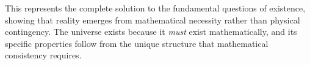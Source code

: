 This represents the complete solution to the fundamental questions of existence, showing that reality emerges from mathematical necessity rather than physical contingency. The universe exists because it \emph{must} exist mathematically, and its specific properties follow from the unique structure that mathematical consistency requires.